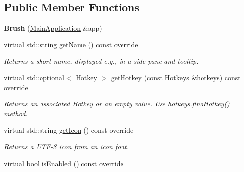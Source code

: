 \subsection*{Public Member Functions}
\begin{DoxyCompactItemize}
\item 
\mbox{\label{classpepr3d_1_1_brush_a2407e6159f4d5798f62763bf53190419}} 
{\bfseries Brush} (\mbox{\hyperlink{classpepr3d_1_1_main_application}{Main\+Application}} \&app)
\item 
\mbox{\label{classpepr3d_1_1_brush_a8a5bfb009a6c666bf0cfdd6afe55812a}} 
virtual std\+::string \mbox{\hyperlink{classpepr3d_1_1_brush_a8a5bfb009a6c666bf0cfdd6afe55812a}{get\+Name}} () const override
\begin{DoxyCompactList}\small\item\em Returns a short name, displayed e.\+g., in a side pane and tooltip. \end{DoxyCompactList}\item 
\mbox{\label{classpepr3d_1_1_brush_aabba5037acc73348535a471b1e8a4979}} 
virtual std\+::optional$<$ \mbox{\hyperlink{structpepr3d_1_1_hotkey}{Hotkey}} $>$ \mbox{\hyperlink{classpepr3d_1_1_brush_aabba5037acc73348535a471b1e8a4979}{get\+Hotkey}} (const \mbox{\hyperlink{classpepr3d_1_1_hotkeys}{Hotkeys}} \&hotkeys) const override
\begin{DoxyCompactList}\small\item\em Returns an associated \mbox{\hyperlink{structpepr3d_1_1_hotkey}{Hotkey}} or an empty value. Use hotkeys.\+find\+Hotkey() method. \end{DoxyCompactList}\item 
\mbox{\label{classpepr3d_1_1_brush_a19ed1135e2c4cc603f001c6af4b2f58f}} 
virtual std\+::string \mbox{\hyperlink{classpepr3d_1_1_brush_a19ed1135e2c4cc603f001c6af4b2f58f}{get\+Icon}} () const override
\begin{DoxyCompactList}\small\item\em Returns a U\+T\+F-\/8 icon from an icon font. \end{DoxyCompactList}\item 
\mbox{\label{classpepr3d_1_1_brush_a158f2295d13bb0a11f28b88f24dd4cfd}} 
virtual bool \mbox{\hyperlink{classpepr3d_1_1_brush_a158f2295d13bb0a11f28b88f24dd4cfd}{is\+Enabled}} () const override

\end{DoxyCompactItemize}
